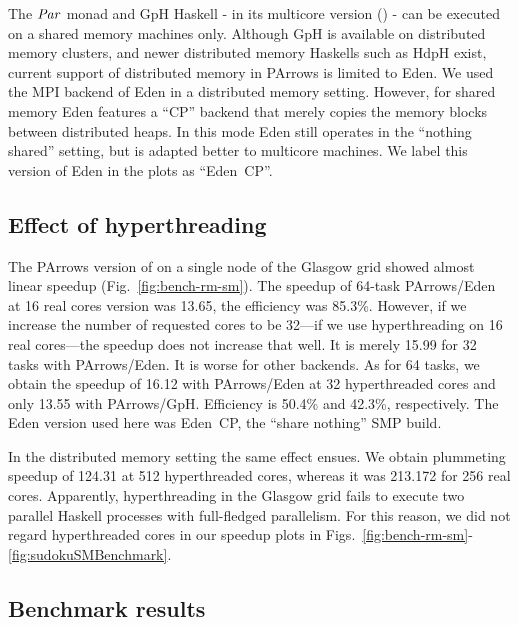 The \ensuremath{\Conid{Par}} monad and GpH Haskell - in its multicore version (\cite{Marlow2009}) -  can be executed on a shared
memory machines only. Although GpH is available on distributed memory
clusters, and newer distributed memory Haskells such as HdpH exist,
current support of distributed memory in PArrows is limited to
Eden. We used the MPI backend of Eden in a distributed memory
setting. However, for shared memory Eden features a ``CP'' backend
that merely copies the memory blocks between distributed heaps. In
this mode Eden still operates in the ``nothing shared'' setting, but
is adapted better to multicore machines. We label this version of Eden
in the plots as ``Eden~CP''.



\subsection{Effect of hyperthreading}

The PArrows version of \rmtest on a single node of the Glasgow grid
showed almost linear speedup (Fig.~\ref{fig:bench-rm-sm}). The speedup
of 64-task PArrows/Eden at 16 real cores version was 13.65, the
efficiency was 85.3\%.  However, if we increase the number of
requested cores to be 32---\ie if we use hyperthreading on 16 real
cores---the speedup does not increase that well. It is merely 15.99
for 32 tasks with PArrows/Eden. It is worse for other backends.  As
for 64 tasks, we obtain the speedup of 16.12 with PArrows/Eden at 32
hyperthreaded cores and only 13.55 with PArrows/GpH. Efficiency is 50.4\% and 42.3\%, respectively. The Eden
version used here was Eden~CP, the ``share nothing'' SMP build.

In the distributed memory setting the same effect ensues. We obtain
plummeting speedup of 124.31 at 512 hyperthreaded cores, whereas it was
213.172 for 256 real cores. Apparently, hyperthreading in the Glasgow
grid fails to execute two parallel Haskell processes with full-fledged
parallelism. For this reason, we did not regard hyperthreaded cores in
our speedup plots in Figs.~\ref{fig:bench-rm-sm}-\ref{fig:sudokuSMBenchmark}.




\subsection{Benchmark results}

